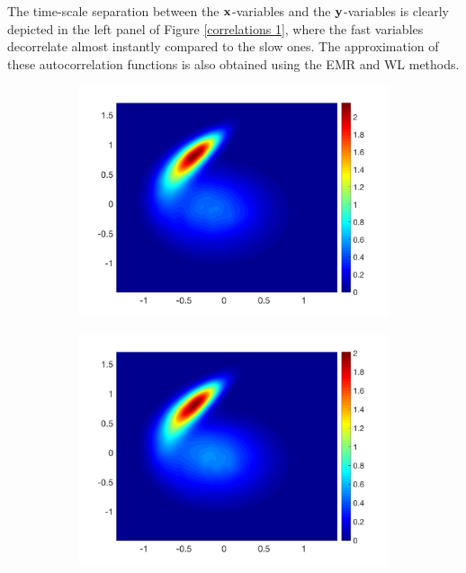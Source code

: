\documentclass[12pt]{article}
\begin{document}
The time-scale separation between the $\mathbf{x}$-variables and the $\mathbf{y}$-variables is clearly depicted in the left panel of Figure \ref{correlations 1}, where the fast variables decorrelate almost instantly compared to the slow ones. The approximation of these autocorrelation functions is also obtained using the EMR and WL methods.

\begin{figure}[H]
	\centering
	\begin{subfigure}[b]{0.32\textwidth}
		\centering
		\includegraphics[width=\textwidth]{plots/climate_model/h01/pdf2d_data_05_01.png}
	\end{subfigure}
	\hfill
	\begin{subfigure}[b]{0.32\textwidth}
		\centering
		\includegraphics[width=\textwidth]{plots/climate_model/h01/pdf2d_emr_05_01.png}

\end{subfigure}
\end{figure}
\end{document}
